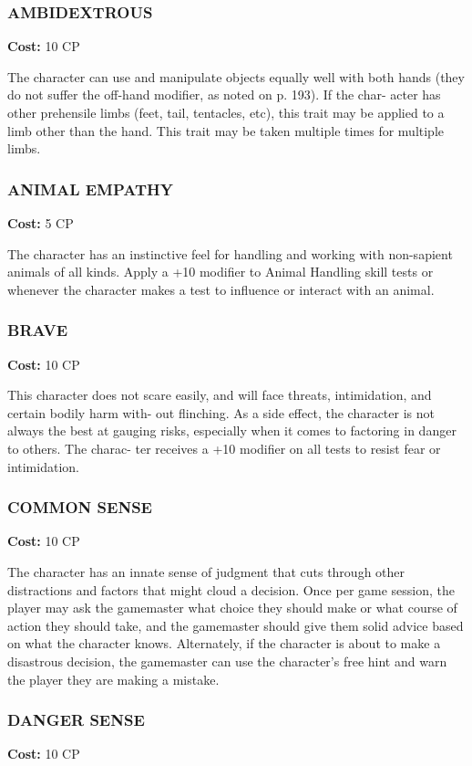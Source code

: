 \subsubsection{AMBIDEXTROUS}
\textbf{Cost:} 10 CP

The character can use and manipulate objects
equally well with both hands (they do not suffer the
off-hand modifier, as noted on p. 193). If the char-
acter has other prehensile limbs (feet, tail, tentacles,
etc), this trait may be applied to a limb other than
the hand. This trait may be taken multiple times for
multiple limbs.

\subsubsection{ANIMAL EMPATHY}
\textbf{Cost:} 5 CP

The character has an instinctive feel for handling
and working with non-sapient animals of all kinds.
Apply a +10 modifier to Animal Handling skill tests
or whenever the character makes a test to influence or
interact with an animal.

\subsubsection{BRAVE}
\textbf{Cost:} 10 CP

This character does not scare easily, and will face
threats, intimidation, and certain bodily harm with-
out flinching. As a side effect, the character is not
always the best at gauging risks, especially when it
comes to factoring in danger to others. The charac-
ter receives a +10 modifier on all tests to resist fear
or intimidation.

\subsubsection{COMMON SENSE}
\textbf{Cost:} 10 CP

The character has an innate sense of judgment that
cuts through other distractions and factors that might
cloud a decision. Once per game session, the player
may ask the gamemaster what choice they should
make or what course of action they should take, and
the gamemaster should give them solid advice based
on what the character knows. Alternately, if the
character is about to make a disastrous decision, the
gamemaster can use the character’s free hint and warn
the player they are making a mistake.

\subsubsection{DANGER SENSE}
\textbf{Cost:} 10 CP

